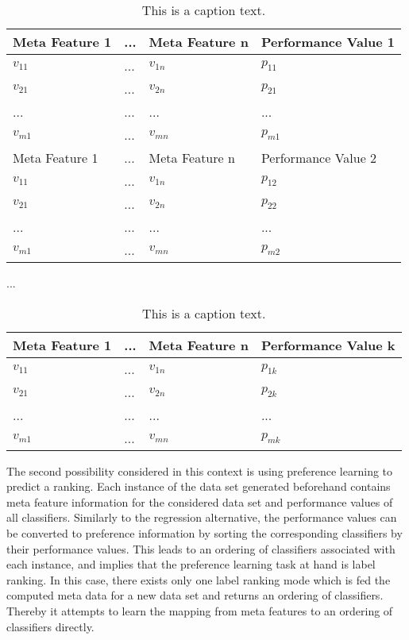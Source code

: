 \begin{table}[h]
\centering
	\begin{tabularx}{\textwidth}{X | X | X | X}
		Meta Feature 1	& ... 	& Meta Feature n		& Performance Value 1	\\ \hline
		$v_{11}$			& ...	& $v_{1n}$			& $p_{11}$				\\ \hline
		$v_{21}$			& ...	& $v_{2n}$			& $p_{21}$				\\ \hline
		...				& ...	& ...				& ...					\\ \hline
		$v_{m1}$			& ... 	& $v_{mn}$			& $p_{m1}$				\\ \hline\hline
		Meta Feature 1	& ... 	& Meta Feature n		& Performance Value 2 	\\ \hline
		$v_{11}$			& ...	& $v_{1n}$			& $p_{12}$				\\ \hline
		$v_{21}$			& ...	& $v_{2n}$			& $p_{22}$				\\ \hline
		...				& ...	& ...				& ...					\\ \hline
		$v_{m1}$			& ... 	& $v_{mn}$			& $p_{m2}$					 
	\end{tabularx}
	
\vspace{1em}
...
\vspace{1em}	
	
	\begin{tabularx}{\textwidth}{X | X | X | X}
		Meta Feature 1	& ... 	& Meta Feature n		& Performance Value k 	\\ \hline
		$v_{11}$			& ...	& $v_{1n}$			& $p_{1k}$				\\ \hline
		$v_{21}$			& ...	& $v_{2n}$			& $p_{2k}$				\\ \hline
		...				& ...	& ...				& ...					\\ \hline
		$v_{m1}$			& ... 	& $v_{mn}$			& $p_{mk}$					 
	\end{tabularx}
	
	\label{tab:table1}
	\caption{This is a caption text.}
\end{table}

The second possibility considered in this context is using preference learning to predict a ranking. Each instance of the data set generated beforehand contains meta feature information for the considered data set and performance values of all classifiers. Similarly to the regression alternative, the performance values can be converted to preference information by sorting the corresponding classifiers by their performance values. This leads to an ordering of classifiers associated with each instance, and implies that the preference learning task at hand is label ranking. In this case, there exists only one label ranking mode which is fed the computed meta data for a new data set and returns an ordering of classifiers. Thereby it attempts to learn the mapping from meta features to an ordering of classifiers directly.

